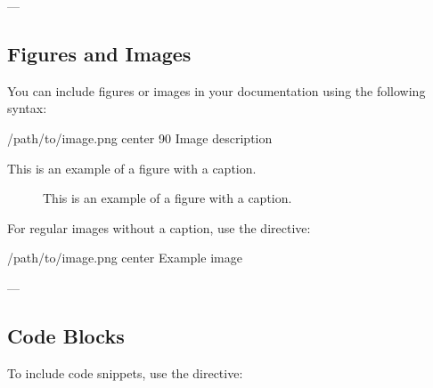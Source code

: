 \documentclass[a4paper,10pt,english]{sphinxmanual}
\begin{document}
\sphinxAtStartPar
—


\subsection{Figures and Images}
\label{\detokenize{page_two:figures-and-images}}
\sphinxAtStartPar
You can include figures or images in your documentation using the following syntax:

\begin{sphinxVerbatim}[commandchars=\\\{\}]
  /path/to/image.png
    center
    90\PYGZpc{}
    Image description

   This is an example of a figure with a caption.
\end{sphinxVerbatim}

\begin{figure}[htbp]
\centering
\capstart

\noindent{}
\caption{This is an example of a figure with a caption.}\label{\detokenize{page_two:id1}}\end{figure}

\sphinxAtStartPar
For regular images without a caption, use the  directive:

\begin{sphinxVerbatim}[commandchars=\\\{\}]
  /path/to/image.png
    center
    Example image
\end{sphinxVerbatim}


\sphinxAtStartPar
—


\subsection{Code Blocks}
\label{\detokenize{page_two:code-blocks}}
\sphinxAtStartPar
To include code snippets, use the  directive:

\begin{sphinxVerbatim}[commandchars=\\\{\}]
  

     
\end{sphinxVerbatim}
\end{document}
